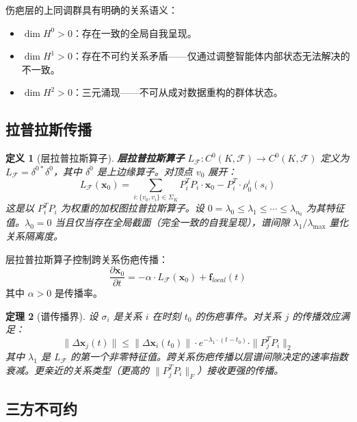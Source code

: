 \documentclass[11pt]{article}
\newtheorem{theorem}{定理}[section]
\newtheorem{definition}[theorem]{定义}
\begin{document}
伤疤层的上同调群具有明确的关系语义：
\begin{itemize}
\item $\dim H^0 > 0$：存在一致的全局自我呈现。
\item $\dim H^1 > 0$：存在不可约关系矛盾——仅通过调整智能体内部状态无法解决的不一致。
\item $\dim H^2 > 0$：三元涌现——不可从成对数据重构的群体状态。
\end{itemize}

\subsection{拉普拉斯传播}

\begin{definition}[层拉普拉斯算子]
\label{def:sheaf-laplacian}
\textbf{层拉普拉斯算子} $L_\mathcal{F}: C^0(K, \mathcal{F}) \to C^0(K, \mathcal{F})$ 定义为 $L_\mathcal{F} = \delta^{0*}\delta^0$，其中 $\delta^0$ 是上边缘算子。对顶点 $v_0$ 展开：
\begin{equation}
L_\mathcal{F}(\mathbf{x}_0) = \sum_{i: \{v_0, v_i\} \in \Sigma_K} P_i^T P_i \cdot \mathbf{x}_0 - P_i^T \cdot \rho_0^i(s_i)
\end{equation}
这是以 $P_i^T P_i$ 为权重的加权图拉普拉斯算子。设 $0 = \lambda_0 \leq \lambda_1 \leq \cdots \leq \lambda_{n_0}$ 为其特征值。$\lambda_0 = 0$ 当且仅当存在全局截面（完全一致的自我呈现），谱间隙 $\lambda_1/\lambda_{\max}$ 量化关系隔离度。
\end{definition}

层拉普拉斯算子控制跨关系伤疤传播：
\begin{equation}
\frac{\partial \mathbf{x}_0}{\partial t} = -\alpha \cdot L_\mathcal{F}(\mathbf{x}_0) + \mathbf{f}_{local}(t)
\end{equation}
其中 $\alpha > 0$ 是传播率。

\begin{theorem}[谱传播界]
\label{thm:sheaf-spectral}
设 $\sigma_i$ 是关系 $i$ 在时刻 $t_0$ 的伤疤事件。对关系 $j$ 的传播效应满足：
\begin{equation}
\|\Delta \mathbf{x}_j(t)\| \leq \|\Delta \mathbf{x}_i(t_0)\| \cdot e^{-\lambda_1 \cdot (t - t_0)} \cdot \|P_j^T P_i\|_2
\end{equation}
其中 $\lambda_1$ 是 $L_\mathcal{F}$ 的第一个非零特征值。跨关系伤疤传播以层谱间隙决定的速率指数衰减。更亲近的关系类型（更高的 $\|P_j^T P_i\|_F$）接收更强的传播。
\end{theorem}

\subsection{三方不可约}
\end{document}
